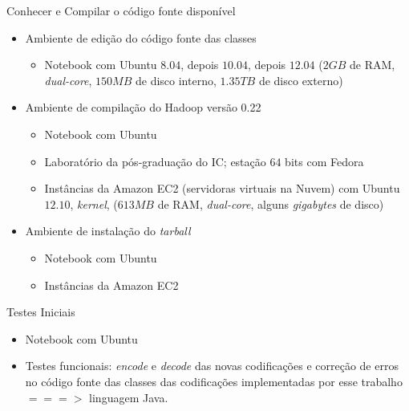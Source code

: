   \begin{frame}{Conhecer e Compilar o código fonte disponível}
     \begin{itemize}
        \item<1-> Ambiente de edição do código fonte das classes
           \begin{itemize}
              \item<2-> Notebook com Ubuntu $8.04$, depois $10.04$, depois $12.04$ ($2GB$ de RAM, \emph{dual-core}, $150MB$ de disco interno, $1.35TB$ de disco externo) 
           \end{itemize}
        \item<3-> Ambiente de compilação do Hadoop versão 0.22
           \begin{itemize}
              \item<4-> Notebook com Ubuntu
              \item<5-> Laboratório da pós-graduação do IC; estação $64$ bits com Fedora
              \item<6-> Instâncias da Amazon EC2 (servidoras virtuais na Nuvem) com Ubuntu $12.10$,  \emph{kernel},  ($613MB$ de RAM, \emph{dual-core}, alguns \emph{gigabytes} de disco)
           \end{itemize}
        \item<7-> Ambiente de instalação do \emph{tarball}
           \begin{itemize}
              \item<8-> Notebook com Ubuntu
              \item<9-> Instâncias da Amazon EC2
           \end{itemize}
     \end{itemize}
  \end{frame}

  \begin{frame}{Testes Iniciais}
     \begin{itemize}
        \item<1-> Notebook com Ubuntu
        \item<2-> Testes funcionais: \emph{encode} e \emph{decode} das novas codificações e correção de erros no código fonte das classes das codificações implementadas por esse trabalho $===>$ linguagem Java.
     \end{itemize}
  \end{frame}

